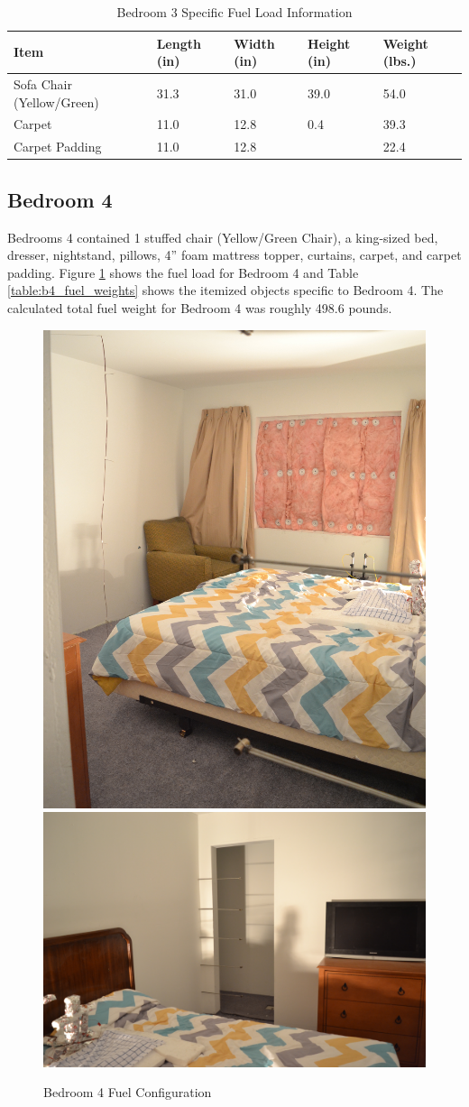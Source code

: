 \documentclass[12pt,oneside]{book}
\begin{document}
\begin{table}[H]
\centering
\begin{tabular}{|L{0.3\textwidth}|C{0.08\textwidth}|C{0.08\textwidth}|C{0.08\textwidth}|C{0.08\textwidth}|}
\hline
Item 						&Length (in) 	&Width (in) 	&Height (in) 	&Weight (lbs.) 	\\ \hline \hline
Sofa Chair (Yellow/Green) 	&31.3 			&31.0 			&39.0 			&54.0 			\\ \hline
Carpet 						&11.0			&12.8			&0.4			&39.3			\\ \hline
Carpet Padding 				&11.0			&12.8			&				&22.4			\\ \hline	 
\end{tabular}
\caption{Bedroom 3 Specific Fuel Load Information}
\label{table:b3_fuel_weights}
\end{table}

\clearpage

\subsection*{Bedroom 4}
Bedrooms 4 contained 1 stuffed chair (Yellow/Green Chair), a king-sized bed, dresser, nightstand, pillows, 4'' foam mattress topper, curtains, carpet, and carpet padding. Figure \ref{figure:Bed4_fuel} shows the fuel load for Bedroom 4 and Table \ref{table:b4_fuel_weights} shows the itemized objects specific to Bedroom 4. The calculated total fuel weight for Bedroom 4 was roughly 498.6 pounds.

\begin{figure}[H]
\centering
\includegraphics[height=0.40\textwidth]{../0_Images/Fuel/Bedroom_4_1.jpg}
\includegraphics[height=0.40\textwidth]{../0_Images/Fuel/Bedroom_4_2.jpg}
\caption{Bedroom 4 Fuel Configuration}
\label{figure:Bed4_fuel}
\end{figure}
\end{document}
